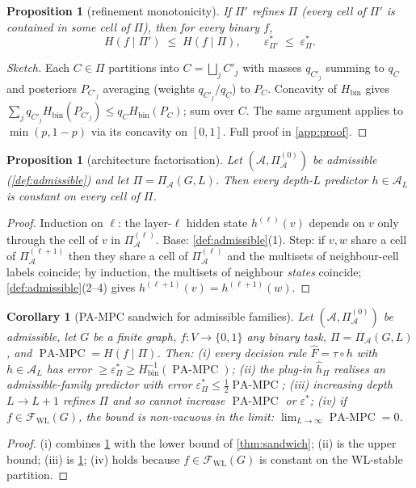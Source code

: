 \documentclass[10pt]{article}
\newtheorem{proposition}[theorem]{Proposition}
\newtheorem{corollary}[theorem]{Corollary}
\theoremstyle{definition}
\theoremstyle{remark}
\newcommand{\Hbin}{H_{\mathrm{bin}}}
\newcommand{\eps}{\varepsilon}
\newcommand{\epsP}{\eps^{*}_{\Pi}}
\newcommand{\PAMPC}{\operatorname{PA\text{-}MPC}}
\newcommand{\Fwl}{\mathcal{F}_{\mathrm{WL}}}
\newcommand{\PiA}{\Pi_{\mathcal{A}}}
\begin{document}
\begin{proposition}[refinement monotonicity]\label{prop:refine}
If $\Pi'$ refines $\Pi$ (every cell of $\Pi'$ is contained in some
cell of $\Pi$), then for every binary $f$,
\[
  H(f \mid \Pi') \;\le\; H(f \mid \Pi),
  \qquad
  \eps^{*}_{\Pi'} \;\le\; \epsP.
\]
\end{proposition}
\begin{proof}[Sketch]
Each $C \in \Pi$ partitions into $C = \bigsqcup_j C'_j$ with masses
$q_{C'_j}$ summing to $q_C$ and posteriors $P_{C'_j}$ averaging
(weights $q_{C'_j}/q_C$) to $P_C$. Concavity of $\Hbin$ gives
$\sum_j q_{C'_j} \Hbin(P_{C'_j}) \le q_C \Hbin(P_C)$; sum over $C$.
The same argument applies to $\min(p, 1 - p)$ via its concavity on
$[0,1]$. Full proof in \cref{app:proof}.
\end{proof}

\begin{proposition}[architecture factorisation]\label{prop:archfact}
Let $(\mathcal{A}, \Pi^{(0)}_{\mathcal{A}})$ be admissible
(\cref{def:admissible}) and let $\Pi = \PiA(G, L)$. Then
every depth-$L$ predictor $h \in \mathcal{A}_L$ is constant on
every cell of $\Pi$.
\end{proposition}
\begin{proof}
Induction on $\ell$: the layer-$\ell$ hidden state $h^{(\ell)}(v)$
depends on $v$ only through the cell of $v$ in
$\Pi^{(\ell)}_{\mathcal{A}}$. Base: \cref{def:admissible}(1).
Step: if $v, w$ share a cell of $\Pi^{(\ell+1)}_{\mathcal{A}}$ then
they share a cell of $\Pi^{(\ell)}_{\mathcal{A}}$ and the multisets
of neighbour-cell labels coincide; by induction, the multisets of
neighbour \emph{states} coincide; \cref{def:admissible}(2--4)
gives $h^{(\ell+1)}(v) = h^{(\ell+1)}(w)$.
\end{proof}

\begin{corollary}[PA-MPC sandwich for admissible families]\label{cor:pampc}
Let $(\mathcal{A}, \Pi^{(0)}_{\mathcal{A}})$ be admissible, let $G$
be a finite graph, $f : V \to \{0,1\}$ any binary task,
$\Pi = \PiA(G, L)$, and $\PAMPC = H(f \mid \Pi)$. Then:
(i) every decision rule $\widehat{F} = \tau \circ h$ with
$h \in \mathcal{A}_L$ has error $\ge \epsP \ge \Hbin^{-1}(\PAMPC)$;
(ii) the plug-in $\hat{h}_\Pi$ realises an admissible-family
predictor with error $\epsP \le \tfrac{1}{2}\PAMPC$;
(iii) increasing depth $L \to L+1$ refines $\Pi$ and so cannot
increase $\PAMPC$ or $\eps^{*}$;
(iv) if $f \in \Fwl(G)$, the bound is non-vacuous in the limit:
$\lim_{L \to \infty} \PAMPC = 0$.
\end{corollary}
\begin{proof}
(i) combines \cref{prop:archfact} with the lower bound
of \cref{thm:sandwich}; (ii) is the upper bound; (iii) is
\cref{prop:refine}; (iv) holds because
$f \in \Fwl(G)$ is constant on the WL-stable partition.
\end{proof}
\end{document}
